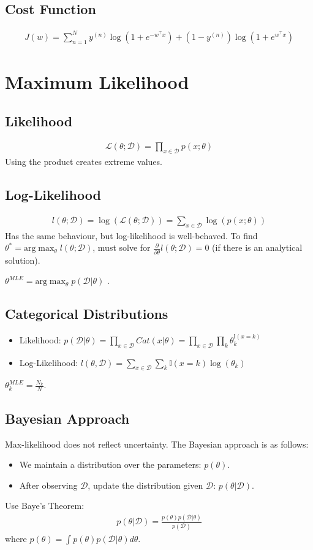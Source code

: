\documentclass{article}
\begin{document}
\subsection{Cost Function}
\begin{align}
    J(w) = \sum_{n=1}^N y^{(n)}\log(1+e^{-w^\top x}) + (1 - y^{(n)})\log(1+e^{w^\top x})
\end{align}
\section{Maximum Likelihood}
\subsection{Likelihood}
\begin{align}
    \mathcal{L}(\theta;\mathcal{D}) = \prod_{x\in \mathcal{D}}p(x;\theta)
\end{align}
Using the product creates extreme values.
\subsection{Log-Likelihood}
\begin{align}
    l(\theta; \mathcal{D}) = \log(\mathcal{L}(\theta;\mathcal{D})) = \sum_{x\in \mathcal{D}}\log(p(x;\theta))
\end{align}
Has the same behaviour, but log-likelihood is well-behaved. To find $\theta^* = \text{arg}\max_\theta l(\theta;\mathcal{D})$, must solve for $\frac{\partial}{\partial \theta}l(\theta;\mathcal{D}) = 0$ (if there is an analytical solution). 

\bigbreak\noindent$\theta^{MLE} = \text{arg}\max_\theta p(\mathcal{D}|\theta)$
.
\subsection{Categorical Distributions}
\begin{itemize}
    \item Likelihood: $p(\mathcal{D}|\theta) = \prod_{x\in \mathcal{D}} Cat(x|\theta) = \prod_{x \in \mathcal{D}}\prod_k \theta_k^{\mathbb{I}(x=k)}$
    \item Log-Likelihood: $l(\theta,\mathcal{D}) = \sum_{x\in \mathcal{D}}\sum_k\mathbb{I}(x=k)\log(\theta_k)$
\end{itemize}
$\theta_k^{MLE} = \frac{N_k}{N}$.
\subsection{Bayesian Approach}
Max-likelihood does not reflect uncertainty. The Bayesian approach is as follows:
\begin{itemize}
    \item We maintain a distribution over the parameters: $p(\theta)$.
    \item After observing $\mathcal{D}$, update the distribution given $\mathcal{D}$: $p(\theta|\mathcal{D})$.
\end{itemize}
Use Baye's Theorem:
\begin{align}
    p(\theta|\mathcal{D}) = \frac{p(\theta)p(\mathcal{D}|\theta)}{p(\mathcal{D})}
\end{align}
where $p(\theta) = \int p(\theta)p(\mathcal{D}|\theta)d\theta$.
\end{document}
